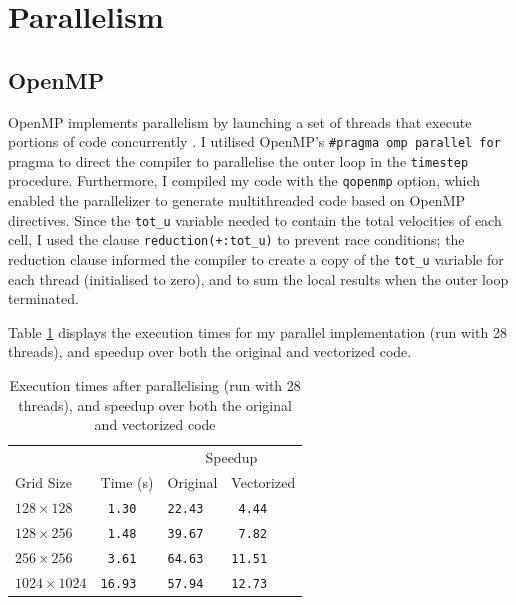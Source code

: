 \documentclass[twocolumn, a4paper]{article}
\begin{document}
\section{Parallelism}


\subsection{OpenMP}

OpenMP implements parallelism by launching a set of threads that execute portions of code concurrently \cite{openmp_cornell}.
I utilised OpenMP's \texttt{\#pragma omp parallel for} pragma to direct the compiler to parallelise the outer loop in the \texttt{timestep} procedure.
Furthermore, I compiled my code with the \texttt{qopenmp} option, which enabled the parallelizer to generate multithreaded code based on OpenMP directives.
Since the \texttt{tot\_u} variable needed to contain the total velocities of each cell, I used the clause \texttt{reduction(+:tot\_u)} to prevent race conditions; the reduction clause informed the compiler to create a copy of the \texttt{tot\_u} variable for each thread (initialised to zero), and to sum the local results when the outer loop terminated.

Table \ref{tab:parallelised} displays the execution times for my parallel implementation (run with 28 threads), and speedup over both the original and vectorized code.

\begin{table}[htbp]
  \begin{center}
  \caption{Execution times after parallelising (run with 28 threads), and speedup over both the original and vectorized code}\label{tab:parallelised}
  \begin{tabular}{l | l  l  l} 
      \hline\hline
      &&\multicolumn{2}{c}{Speedup}\\
      \cline{3-4}
      Grid Size&Time (s)&Original&Vectorized\\
      \hline
      $128 \times 128$&\texttt{ 1.30}&\texttt{22.43}&\texttt{ 4.44}\\
      $128 \times 256$&\texttt{ 1.48}&\texttt{39.67}&\texttt{ 7.82}\\
      $256 \times 256$&\texttt{ 3.61}&\texttt{64.63}&\texttt{11.51}\\
      $1024 \times 1024$&\texttt{16.93}&\texttt{57.94}&\texttt{12.73}\\
      \hline
    \end{tabular}
  \end{center}
\end{table}
\end{document}
